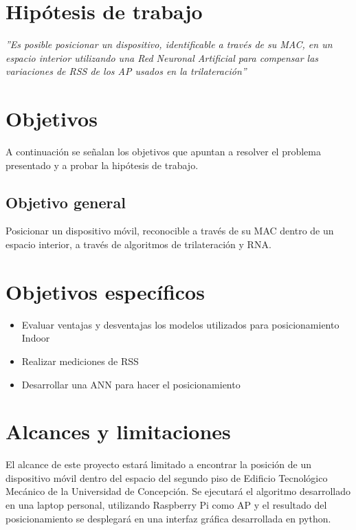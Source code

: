                 \clearpage 
\section{Hipótesis de trabajo}
\begin{center}
\textit{''Es posible posicionar un dispositivo, identificable a través de su MAC, en un espacio interior utilizando una Red Neuronal Artificial para compensar las variaciones de RSS de los \ac{AP} usados en la trilateración''}
\end{center}

\section{Objetivos}
A continuación se señalan los objetivos que apuntan a resolver el problema presentado y a probar la hipótesis de trabajo.

\subsection{Objetivo general}
Posicionar un dispositivo móvil, reconocible a través de su \ac{MAC} dentro de un espacio interior, a través de algoritmos de trilateración y \ac{RNA}.

\section{Objetivos específicos}
\begin{itemize}[label={\checkmark}]
\item{Evaluar ventajas y desventajas los modelos utilizados para posicionamiento Indoor}
\item{Realizar mediciones de RSS}
\item{Desarrollar una ANN para hacer el posicionamiento}
\end{itemize}

\section{Alcances y limitaciones}
El alcance de este proyecto estará limitado a encontrar la posición de un dispositivo móvil dentro del espacio del segundo piso de Edificio Tecnológico Mecánico de la Universidad de Concepción. Se ejecutará el algoritmo desarrollado en una laptop personal, utilizando Raspberry Pi como \ac{AP} y el resultado del posicionamiento se desplegará en una interfaz gráfica desarrollada en python.


